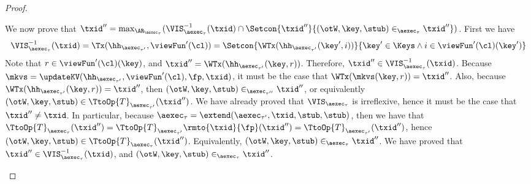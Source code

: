 \begin{proof}
\begin{itemize}
\begin{itemize}
We now prove that 
$\txid'' = \max_{\AR_{\aexec_{\tau}}}(\VIS^{-1}_{\aexec_{\tau}}(\txid) \cap \Setcon{ \txid'' }{ (\otW, \key, \stub) \in_{\aexec_{\tau}} \txid''})$. 
First we have
\[ 
\begin{array}{l}
\VIS^{-1}_{\aexec_{\tau}}(\txid) = 
\Tx(\hh_{\aexec_{\tau'}}, \viewFun'(\cl)) = 
\Setcon{\WTx(\hh_{\aexec_{\tau'}}(\key',  i)) }{ \key' \in \Keys \wedge  i \in \viewFun'(\cl)(\key')}
\end{array}
\]
Note that $r \in \viewFun'(\cl)(\key)$, and $\txid'' = \WTx(\hh_{\aexec_{\tau'}}(\key, r))$. 
Therefore, $\txid'' \in \VIS^{-1}_{\aexec_{\tau}}(\txid)$. 
Because $\mkvs = \updateKV(\hh_{\aexec_{\tau'}}, \viewFun'(\cl), \fp, \txid)$, it 
must be the case that $\WTx(\mkvs(\key, r)) = \txid''$. Also, because $\WTx(\hh_{\aexec_{\tau'}}(\key, r)) = \txid''$, 
then $(\otW, \key, \stub) \in_{\aexec_{\tau''}} \txid''$, or equivalently $(\otW, \key, \stub) \in \TtoOp{T}_{\aexec_{\tau'}}(\txid'')$. 
We have already proved that $\VIS_{\aexec_{\tau}}$ is irreflexive, hence it must be the case that $\txid'' \neq \txid$. 
In particular, because $\aexec_{\tau} = \extend(\aexec_{\tau'}, \txid, \stub, \stub)$, then we have that 
$\TtoOp{T}_{\aexec_{\tau}}(\txid'') = \TtoOp{T}_{\aexec_{\tau'}}\rmto{\txid}{\fp}(\txid'') = 
\TtoOp{T}_{\aexec_{\tau'}}(\txid'')$, hence $(\otW, \key, \stub) \in \TtoOp{T}_{\aexec_{\tau}}(\txid'')$. Equivalently, 
$(\otW, \key, \stub) \in_{\aexec_{\tau}} \txid''$. We have proved that $\txid'' \in \VIS^{-1}_{\aexec_{\tau}}(\txid)$, 
and $(\otW, \key, \stub) \in_{\aexec_{\tau}} \txid''$. 


\end{itemize}
\end{itemize}
\end{proof}
